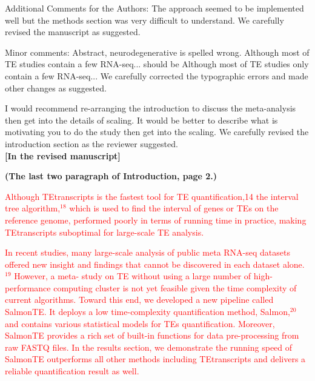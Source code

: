 \documentclass[10pt]{article}
\begin{document}
\begin{response}{Additional Comments for the Authors: The approach seemed to be implemented well but the methods section was very difficult to understand.}
We carefully revised the manuscript as suggested. 
\end{response}

\begin{response}{
Minor comments: Abstract, neurodegenerative is spelled wrong. Although most of TE studies contain a few RNA-seq... should be Although most of TE studies only contain a few RNA-seq... 
}
We carefully corrected the typographic errors and made other changes as suggested.
\end{response}

\begin{response}{
I would recommend re-arranging the introduction to discuss the meta-analysis then get into the details of scaling. It would be better to describe what is motivating you to do the study then get into the scaling. 
}
We carefully revised the introduction section as the reviewer suggested.
\\

\noindent\textbf{[In the revised manuscript]} 

\noindent\textbf{(The last two paragraph of Introduction, page 2.)}


\textcolor{red}{
Although TEtranscripts is the fastest tool for TE quantification,14 the interval tree algorithm,$^{18}$ which is used to find the interval of genes or TEs on the reference genome, performed poorly in terms of running time in practice, making TEtranscripts suboptimal for large-scale TE analysis.}

\textcolor{red}{
In recent studies, many large-scale analysis of public meta RNA-seq datasets offered new insight and findings that cannot be discovered in each dataset alone.$^{19}$ However, a meta- study on TE without using a large number of high-performance computing cluster is not yet feasible given the time complexity of current algorithms. Toward this end, we developed a new pipeline called SalmonTE. It deploys a low time-complexity quantification method, Salmon,$^{20}$ and contains various statistical models for TEs quantification. Moreover, SalmonTE provides a rich set of built-in functions for data pre-processing from raw FASTQ files. In the results section, we demonstrate the running speed of SalmonTE outperforms all other methods including TEtranscripts and delivers a reliable quantification result as well.
}
\end{response}
\end{document}
